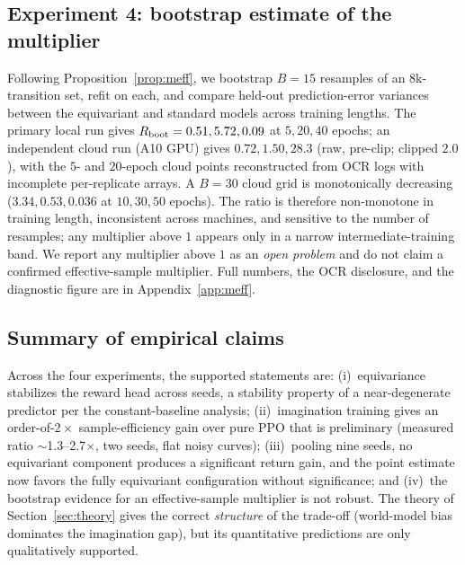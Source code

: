 \documentclass[preprint,12pt]{elsarticle}
\begin{document}
\subsection{Experiment 4: bootstrap estimate of the multiplier}
Following Proposition~\ref{prop:meff}, we bootstrap $B=15$ resamples of an
$8$k-transition set, refit on each, and compare held-out prediction-error
variances between the equivariant and standard models across training
lengths. The primary local run gives $R_{\rm boot}=0.51, 5.72, 0.09$ at
$5,20,40$ epochs; an independent cloud run (A10 GPU) gives $0.72, 1.50,
28.3$ (raw, pre-clip; clipped $2.0$), with the $5$- and $20$-epoch cloud
points reconstructed from OCR logs with incomplete per-replicate arrays. A
$B=30$ cloud grid is monotonically decreasing ($3.34, 0.53, 0.036$ at
$10,30,50$ epochs). The ratio is therefore non-monotone in training length,
inconsistent across machines, and sensitive to the number of resamples; any
multiplier above $1$ appears only in a narrow intermediate-training band. We
report any multiplier above $1$ as an \emph{open problem} and do not claim a
confirmed effective-sample multiplier. Full numbers, the OCR disclosure, and
the diagnostic figure are in Appendix~\ref{app:meff}.

\subsection{Summary of empirical claims}
Across the four experiments, the supported statements are:
(i)~equivariance stabilizes the reward head across seeds, a stability
property of a near-degenerate predictor per the constant-baseline analysis;
(ii)~imagination training gives an order-of-$2\times$ sample-efficiency
gain over pure PPO that is preliminary (measured ratio $\sim$1.3--2.7$\times$,
two seeds, flat noisy curves); (iii)~pooling nine seeds, no equivariant
component produces a significant return gain, and the point estimate now
favors the fully equivariant configuration without significance; and
(iv)~the bootstrap evidence for an effective-sample multiplier is not robust.
The theory of Section~\ref{sec:theory} gives the correct \emph{structure} of
the trade-off (world-model bias dominates the imagination gap), but its
quantitative predictions are only qualitatively supported.

\end{document}
